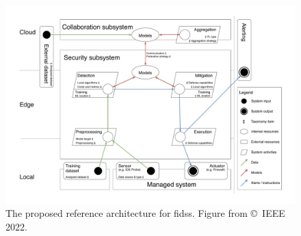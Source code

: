 \begin{figure}
  \centering
  \includegraphics[width=.95\textwidth]{figures/architecture.drawio.pdf}
  \caption[
    The proposed reference architecture for \glspl{fids}.
  ]{
    The proposed reference architecture for \glspl{fids}.
    Figure from \textcite{lavaur_EvolutionFederatedLearningbased_2022} \copyright~IEEE 2022.
    \label{fig:sota.archi}
  }
\end{figure}

